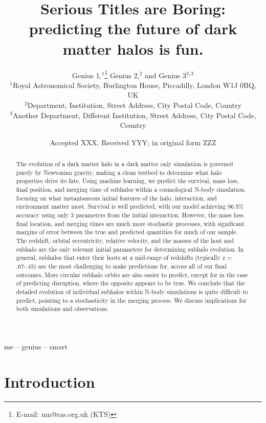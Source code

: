 \documentclass[fleqn,usenatbib]{mnras}
\title[Abbie=Smart Person]{Serious Titles are Boring: predicting the future of dark matter halos is fun.}
\author[Very Smart]{
Genius 1,$^{1}$\thanks{E-mail: mn@ras.org.uk (KTS)}
Genius 2,$^{2}$
and Genius 3$^{2,3}$
\\
$^{1}$Royal Astronomical Society, Burlington House, Piccadilly, London W1J 0BQ, UK\\
$^{2}$Department, Institution, Street Address, City Postal Code, Country\\
$^{3}$Another Department, Different Institution, Street Address, City Postal Code, Country
}
\date{Accepted XXX. Received YYY; in original form ZZZ}
\begin{document}
\label{firstpage}
\pagerange{\pageref{firstpage}--\pageref{lastpage}}
\maketitle

\begin{abstract}
The evolution of a dark matter halo in a dark matter only simulation is governed purely by Newtonian gravity, making a clean testbed to determine what halo properties drive its fate. Using machine learning, we predict the survival, mass loss, final position, and merging time of subhalos within a cosmological N-body simulation, focusing on what instantaneous initial features of the halo, interaction, and environment matter most. Survival is well predicted, with our model achieving 96.5\% accuracy using only 3 parameters from the initial interaction. However, the mass loss, final location, and merging times are much more stochastic processes, with significant margins of error between the true and predicted quantities for much of our sample. The redshift, orbital eccentricity, relative velocity, and the masses of the host and subhalo are the only relevant initial parameters for determining subhalo evolution. In general, subhalos that enter their hosts at a mid-range of redshifts (typically z = .67-.43) are the most challenging to make predictions for, across all of our final outcomes. More circular subhalo orbits are also easier to predict, except for in the case of predicting disruption, where the opposite appears to be true. We conclude that the detailed evolution of individual subhalos within N-body simulations is quite difficult to predict, pointing to a stochasticity in the merging process. We discuss implications for both simulations and observations.
\end{abstract}

\begin{keywords}
me -- genius -- smart
\end{keywords}



\section{Introduction}
\end{document}
